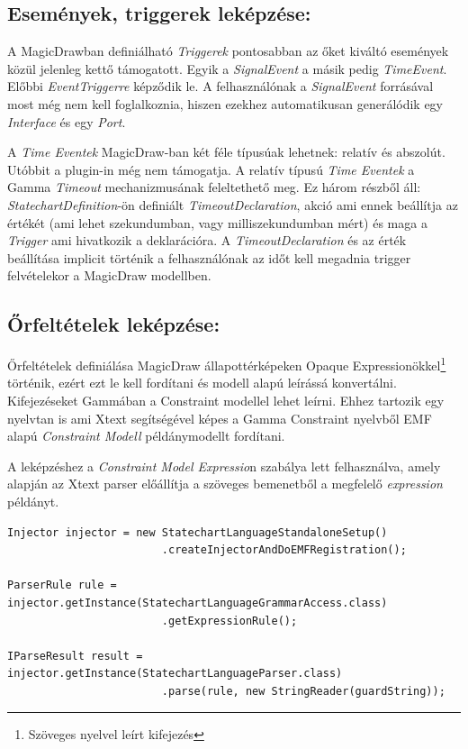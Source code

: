 \subsection{Események, triggerek leképzése:} A MagicDrawban definiálható \emph{Triggerek} pontosabban az őket kiváltó események közül jelenleg kettő támogatott. Egyik a \emph{SignalEvent} a másik pedig \emph{TimeEvent}. Előbbi \emph{EventTriggerre} képződik le. A felhasználónak a \emph{SignalEvent} forrásával most még nem kell foglalkoznia, hiszen ezekhez automatikusan generálódik egy \emph{Interface} és egy \emph{Port}.

A \emph{Time Eventek} MagicDraw-ban két féle típusúak lehetnek: relatív és abszolút. Utóbbit a plugin-in még nem támogatja.
A relatív típusú \emph{Time Eventek} a Gamma \emph{Timeout} mechanizmusának feleltethető meg. Ez három részből áll: \emph{StatechartDefinition}-ön definiált \emph{TimeoutDeclaration}, akció ami ennek beállítja az értékét (ami lehet szekundumban, vagy milliszekundumban mért) és maga a \emph{Trigger} ami hivatkozik a deklarációra. A \emph{TimeoutDeclaration} és az érték beállítása implicit történik a felhasználónak az időt kell megadnia trigger felvételekor a MagicDraw modellben.




\subsection{Őrfeltételek leképzése:}
Őrfeltételek definiálása MagicDraw állapottérképeken Opaque Expressionökkel\footnote{Szöveges nyelvel leírt kifejezés} történik, ezért ezt le kell fordítani és modell alapú leírássá konvertálni. Kifejezéseket Gammában a Constraint modellel lehet leírni. Ehhez tartozik egy nyelvtan is ami Xtext segítségével képes a Gamma Constraint nyelvből EMF alapú \emph{Constraint Modell} példánymodellt fordítani.

A leképzéshez a \emph{Constraint Model Expressio}n szabálya lett felhasználva, amely alapján az Xtext parser előállítja a szöveges bemenetből a megfelelő \emph{expression} példányt.
\lstset{style=javacode}
\begin{lstlisting}
Injector injector = new StatechartLanguageStandaloneSetup()
						.createInjectorAndDoEMFRegistration();
						
ParserRule rule = injector.getInstance(StatechartLanguageGrammarAccess.class)
						.getExpressionRule();
						
IParseResult result = injector.getInstance(StatechartLanguageParser.class)
						.parse(rule, new StringReader(guardString));
\end{lstlisting}

